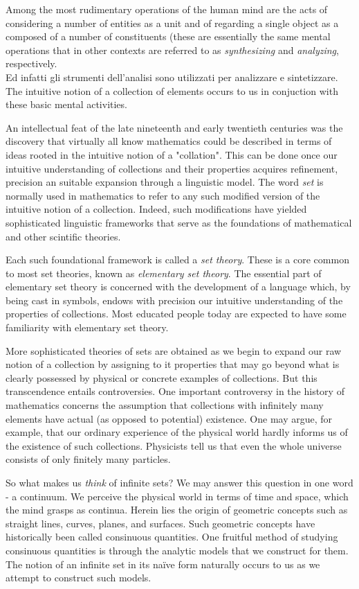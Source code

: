 Among the most rudimentary operations of the human mind are the acts of considering
a number of entities as a unit and 
of regarding a single object as a composed of a number of constituents 
(these are essentially the same mental operations that in other contexts are referred to as \emph{synthesizing} and \emph{analyzing}, respectively. \\
Ed infatti gli strumenti dell'analisi sono utilizzati per analizzare e sintetizzare. The intuitive notion of a collection of elements occurs to us in conjuction with these basic mental activities. 

An intellectual feat of the late nineteenth and early twentieth centuries was the discovery that virtually all know mathematics could be described in terms of ideas rooted in the intuitive notion of a "collation". This can be done once our intuitive understanding of collections and their properties acquires refinement, precision an suitable expansion through a linguistic model. The word \emph{set} is normally used in mathematics to refer to any such modified version of the intuitive notion of a collection. Indeed, such modifications have yielded sophisticated linguistic frameworks that serve as the foundations of mathematical and other scintific theories.

Each such foundational framework is called a \emph{set theory}. These is a core common to most set theories, known as \emph{elementary set theory}. The essential part of elementary set theory is concerned with the development of a language which, by being cast in symbols, endows with precision our intuitive understanding of the properties of collections. Most educated people today are expected to have some familiarity with elementary set theory.

More sophisticated theories of sets are obtained as we begin to expand our raw notion of a collection by assigning to it properties that may go beyond what is clearly possessed by physical or concrete examples of collections. But this transcendence entails controversies. One important controversy in the history of mathematics concerns the assumption that collections with infinitely many elements have actual (as opposed to potential) existence. One may argue, for example, that our ordinary experience of the physical world hardly informs us of the existence of such collections. Physicists tell us that even the whole universe consists of only finitely many particles.

So what makes us \emph{think} of infinite sets? We may answer this question in one word - a continuum. We perceive the physical world in terms of time and space, which the mind grasps as continua. Herein lies the origin of geometric concepts such as straight lines, curves, planes, and surfaces. Such geometric concepts have historically been called consinuous quantities. One fruitful method of studying consinuous quantities is through the analytic models that we construct for them. The notion of an infinite set in its na\"ive form naturally occurs to us as we attempt to construct such models.

